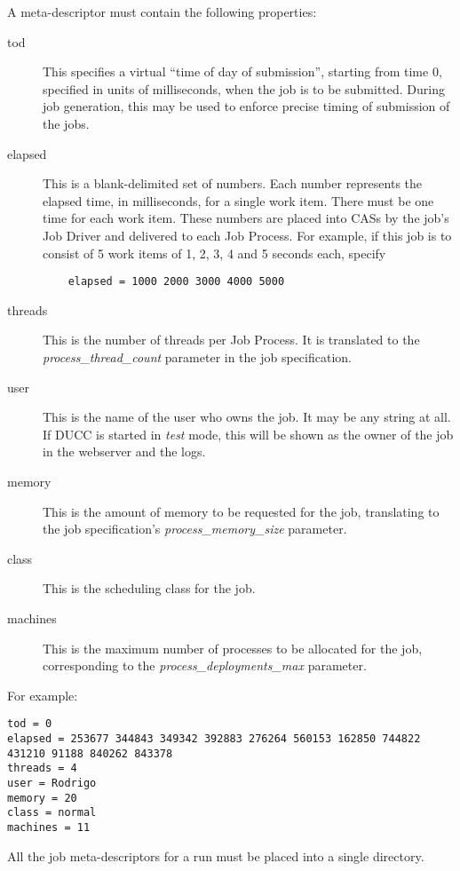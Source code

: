      A meta-descriptor must contain the following properties:
     \begin{description}
       \item[tod] This specifies a virtual ``time of day of submission'', starting from time 0, specified
         in units of milliseconds, when the job is to be submitted.  During job generation, this may
         be used to enforce precise timing of submission of the jobs.
       \item[elapsed] This is a blank-delimited set of numbers.  Each number represents the elapsed time,
         in milliseconds, for a single work item.  There must be one time for each work item.  
         These numbers are placed into CASs by the job's Job Driver and delivered to each Job Process.
         For example,
         if this job is to consist of 5 work items of 1, 2, 3, 4 and 5 seconds each, specify
\begin{verbatim}
    elapsed = 1000 2000 3000 4000 5000
\end{verbatim}
       \item[threads] This is the number of threads per Job Process.  It is translated to the
         {\em process\_thread\_count} parameter in the job specification.
       \item[user] This is the name of the user who owns the job.  It may be any string at
         all.  If DUCC is started in {\em test} mode, this will be shown as the owner of 
         the job in the webserver and the logs.
       \item[memory] This is the amount of memory to be requested for the job, translating
         to the job specification's {\em process\_memory\_size} parameter.
       \item[class] This is the scheduling class for the job.
       \item[machines] This is the maximum number of processes to be allocated for the
         job, corresponding to the {\em process\_deployments\_max} parameter.
       \end{description}
       
       For example:
\begin{verbatim}
tod = 0
elapsed = 253677 344843 349342 392883 276264 560153 162850 744822 431210 91188 840262 843378 
threads = 4
user = Rodrigo
memory = 20
class = normal
machines = 11
\end{verbatim}

       All the job meta-descriptors for a run must be placed into a single directory.


